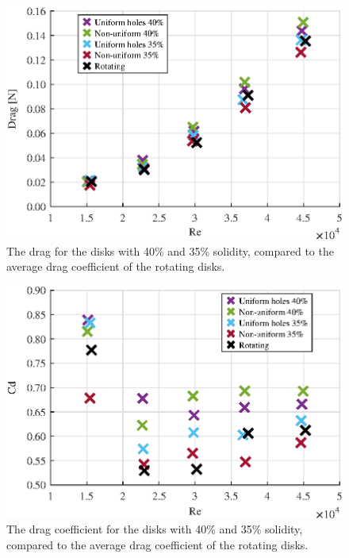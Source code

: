 \begin{figure}
    \centering
    \includegraphics[width=0.8\linewidth]{0_Images/FortyDragRe.eps}
    \caption{The drag for the disks with 40\% and 35\% solidity, compared to the average drag coefficient of the rotating disks.}
    \label{fig:FortyDrag}
\end{figure}

\begin{figure}
    \centering
    \includegraphics[width=0.8\linewidth]{0_Images/FortyCDRe.eps}
    \caption{The drag coefficient for the disks with 40\% and 35\% solidity, compared to the average drag coefficient of the rotating disks.}
    \label{fig:FortyCD}
\end{figure}


